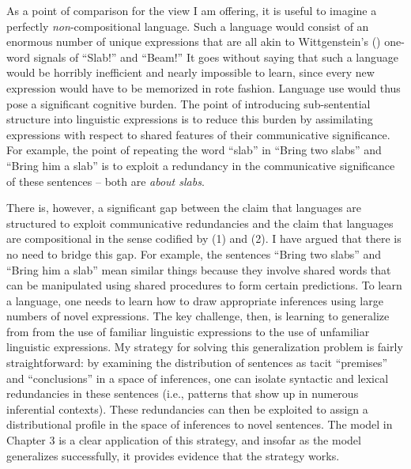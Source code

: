 As a point of comparison for the view I am offering, it is useful to imagine a perfectly \textit{non}-compositional language. Such a language would consist of an enormous number of unique expressions that are all akin to Wittgenstein's (\citeyear{Wittgenstein:1953}) one-word signals of ``Slab!'' and ``Beam!'' It goes without saying that such a language would be horribly inefficient and nearly impossible to learn, since every new expression would have to be memorized in rote fashion. Language use would thus pose a significant cognitive burden. The point of introducing sub-sentential structure into linguistic expressions is to reduce this burden by assimilating expressions with respect to shared features of their communicative significance. For example, the point of repeating the word ``slab'' in ``Bring two slabs'' and ``Bring him a slab'' is to exploit a redundancy in the communicative significance of these sentences -- both are \textit{about slabs}. 

There is, however, a significant gap between the claim that languages are structured to exploit communicative redundancies and the claim that languages are compositional in the sense codified by (1) and (2). I have argued that there is no need to bridge this gap. For example, the sentences ``Bring two slabs'' and ``Bring him a slab'' mean similar things because they involve shared words that can be manipulated using shared procedures to form certain predictions. To learn a language, one needs to learn how to draw appropriate inferences using large numbers of novel expressions. The key challenge, then, is learning to generalize from from the use of familiar linguistic expressions to the use of unfamiliar linguistic expressions. My strategy for solving this generalization problem is fairly straightforward: by examining the distribution of sentences as tacit ``premises'' and ``conclusions'' in a space of inferences, one can isolate syntactic and lexical redundancies in these sentences (i.e., patterns that show up in numerous inferential contexts). These redundancies can then be exploited to assign a distributional profile in the space of inferences to novel sentences.  The model in Chapter 3 is a clear application of this strategy, and insofar as the model generalizes successfully, it provides evidence that the strategy works. 

